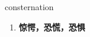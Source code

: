 
\begin{frame}
{\huge consternation}
\begin{center}
\begin{enumerate}\Large
  \item \textbf{惊愕，恐慌，恐惧}
\end{enumerate}
\end{center}
\end{frame}
